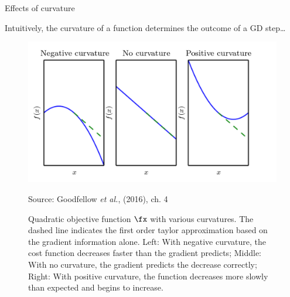 \begin{frame} {Effects of curvature}

Intuitively, the curvature of a function determines the outcome of a GD step\dots


\vspace*{-0.5cm}
\begin{figure}
\captionsetup{font=footnotesize,labelfont=footnotesize, labelfont = bf}
\begin{center}
	\includegraphics[width=.7\textwidth]{figure/curvature.png}
\end{center}
\tiny{Source: Goodfellow \emph{et al.}, (2016), ch. 4}
\caption{Quadratic objective function $\fx$ with various curvatures.
The dashed line indicates the first order taylor approximation based on the gradient information alone. Left: With negative curvature, the cost function decreases faster than the gradient predicts; Middle: With no curvature, the gradient predicts the decrease correctly; Right: With positive curvature, the function decreases more slowly than expected and begins to increase. }
\end{figure}
\end{frame}

